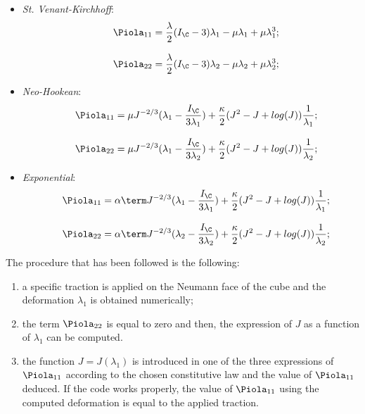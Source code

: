 \begin{itemize}
\item \textit{St. Venant-Kirchhoff}:
  \begin{equation}
    \begin{array}{lll} & \Piola_{11}=\displaystyle
      \frac{\lambda}{2}(I_{\C}-3)\lambda_1 - \mu\lambda_1 +
      \mu\lambda_1^3;\\ \\ & \Piola_{22}=\displaystyle
      \frac{\lambda}{2}(I_{\C}-3)\lambda_2 - \mu\lambda_2 + \mu\lambda_2^3;
    \end{array}
    \label{eq::P11SVK}
  \end{equation}
\item \textit{Neo-Hookean}:
  \begin{equation}
    \begin{array}{lll} & \Piola_{11}=\displaystyle \mu J^{-2/3}
      (\lambda_1 - \frac{I_{\C}}{3\lambda_1}) + \frac{\kappa}{2}(J^2 - J +
      log(J))\frac{1}{\lambda_1};\\ \\ & \Piola_{22}=\displaystyle \mu
      J^{-2/3} (\lambda_1 - \frac{I_{\C}}{3\lambda_2}) +
      \frac{\kappa}{2}(J^2 - J + log(J))\frac{1}{\lambda_2};
    \end{array}
    \label{eq::P11NH}
  \end{equation}
\item \textit{Exponential}:
  \begin{equation}
    \begin{array}{lll} & \Piola_{11}=\displaystyle \alpha \term
      J^{-2/3}(\lambda_1 - \frac{I_{\C}}{3\lambda_1})+\frac{\kappa}{2}(J^2 -
      J + log(J))\frac{1}{\lambda_1};\\ \\ & \Piola_{22}=\displaystyle
      \alpha \term J^{-2/3}(\lambda_2 -
      \frac{I_{\C}}{3\lambda_2})+\frac{\kappa}{2}(J^2 - J +
      log(J))\frac{1}{\lambda_2};
    \end{array}
    \label{eq::P11EXP}
  \end{equation}
\end{itemize}
The procedure that has been followed is the following:
\begin{enumerate}
\item a specific traction is applied on the Neumann face of the cube
  and the deformation $\lambda_1$ is obtained numerically;
\item the term $\Piola_{22}$ is equal to zero and then, the
  expression of $J$ as a function of $\lambda_1$ can be computed.
\item the function $J=J(\lambda_1)$ is introduced in one of the
  three expressions of $\Piola_{11}$ according to the chosen
  constitutive law and the value of $\Piola_{11}$ deduced. If the code
  works properly, the value of $\Piola_{11}$ using the computed
  deformation is equal to the applied traction.
\end{enumerate}
